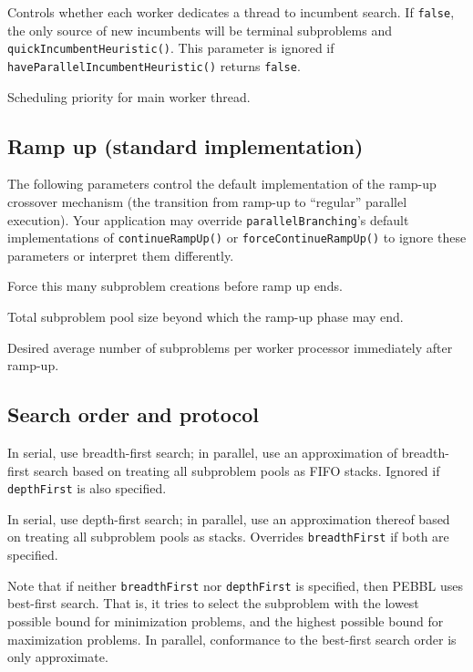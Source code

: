 Controls whether each worker dedicates a thread to incumbent search.
If \texttt{false}, the only source of new incumbents will be terminal
subproblems and  \texttt{quickIncumbentHeuristic()}.  This
parameter is ignored if \texttt{haveParallelIncumbentHeuristic()}
returns \texttt{false}.

Scheduling priority for main worker thread.


\subsection{Ramp up (standard implementation)}
The following parameters control the default implementation of the
ramp-up crossover mechanism (the transition from ramp-up to
``regular'' parallel execution).  Your application may override
\texttt{parallelBranching}'s default implementations of
\texttt{continueRampUp()} or \texttt{forceContinueRampUp()} to ignore
these parameters or interpret them differently.

Force this many subproblem creations before ramp up ends.

Total subproblem pool size beyond which the ramp-up phase may end.

Desired average number of subproblems per worker processor
immediately after ramp-up.


\subsection{Search order and protocol}
\label{sec:searchparams}
\vspace{-3ex}
In serial, use breadth-first search; in parallel, use an approximation
of breadth-first search based on treating all subproblem pools as FIFO
stacks.  Ignored if \texttt{depthFirst} is also specified.

In serial, use depth-first search; in
parallel, use an approximation thereof based on treating all
subproblem pools as stacks.  Overrides \texttt{breadthFirst} if both
are specified.

\vspace{2ex}

Note that if neither \texttt{breadthFirst} nor \texttt{depthFirst} is
specified, then PEBBL uses best-first search.  That is, it tries to
select the subproblem with the lowest possible bound for minimization
problems, and the highest possible bound for maximization problems.
In parallel, conformance to the best-first search order is only approximate.


